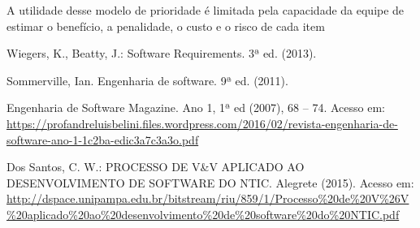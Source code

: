 \documentclass[runningheads]{llncs}
\begin{document}
A utilidade desse modelo de prioridade é limitada pela capacidade da equipe de estimar o benefício, a penalidade, o custo e o risco de cada item




%
%
%
% 
%

\begin{thebibliography}{}
Wiegers, K., Beatty, J.: Software Requirements. 3ª ed. (2013).

Sommerville, Ian. Engenharia de software. 9ª ed. (2011).

Engenharia de Software Magazine. Ano 1, 1ª ed (2007), 68 -- 74. Acesso em: \url{https://profandreluisbelini.files.wordpress.com/2016/02/revista-engenharia-de-software-ano-1-1c2ba-edic3a7c3a3o.pdf}

Dos Santos, C. W.: PROCESSO DE V&V APLICADO AO DESENVOLVIMENTO DE SOFTWARE DO NTIC. Alegrete (2015). Acesso em: \url{http://dspace.unipampa.edu.br/bitstream/riu/859/1/Processo\%20de\%20V\%26V\%20aplicado\%20ao\%20desenvolvimento\%20de\%20software\%20do\%20NTIC.pdf}

\end{thebibliography}
\end{document}
